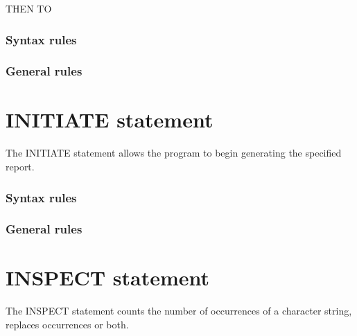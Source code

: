 \begin{syntax}
  \begin{0-1}
    THEN TO 
  \end{0-1}
\end{syntax}

\subsubsection{Syntax rules}

\subsubsection{General rules}

\section{INITIATE statement}

The INITIATE statement allows the program to begin generating the specified report.

\begin{syntax}
\end{syntax}

\subsubsection{Syntax rules}

\subsubsection{General rules}

\section{INSPECT statement}

The INSPECT statement counts the number of occurrences of a character string, replaces occurrences or both.

\begin{syntax}
  \begin{1=}
    \identifier \\
    \literal \\
    \functionname
  \end{1=}
  \begin{1=}
    \begin{0-1}
    \end{0-1} \\

     \\
  \end{1=}
\end{syntax}

